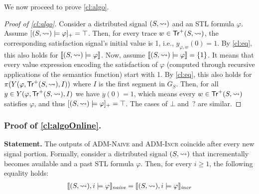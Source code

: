 We now proceed to prove \cref{cl:algo}.

\begin{proof}[\normalsize Proof of \cref{cl:algo}]
	\normalsize
	Consider a distributed signal $(S,{\rightsquigarrow})$ and an STL formula $\varphi$.
	Assume $[(S,{\rightsquigarrow}) \models \varphi]_+ = \top$.
	Then, for every trace $w \in \mathsf{Tr}^+(S,{\rightsquigarrow})$, the corresponding satisfaction signal's initial value is 1, i.e., $y_{\varphi,w}(0) = 1$.
	By \cref{cl:eq}, this also holds for $\llbracket (S, {\rightsquigarrow}) \models \varphi \rrbracket$.
	Now, assume  $\llbracket (S, {\rightsquigarrow}) \models \varphi \rrbracket = \{1\}$.
	It means that every value expression encoding the satisfaction of $\varphi$ (computed through recursive applications of the semantics function) start with 1.
	By \cref{cl:eq}, this also holds for $\pi(Y(\varphi, \mathsf{Tr}^+(S,{\rightsquigarrow}), I))$ where $I$ is the first segment in $G_S$.
	Then, for all $y \in Y(\varphi, \mathsf{Tr}^+(S,{\rightsquigarrow}), I)$ we have $y(0) = 1$, which means every $w \in \mathsf{Tr}^+(S,{\rightsquigarrow})$ satisfies $\varphi$, and thus $[(S,{\rightsquigarrow}) \models \varphi]_+ = \top$.
	The cases of $\bot$ and ${\,?}$ are similar.
\end{proof}

\bgroup \color{red}
\subsubsection*{Proof of \cref{cl:algoOnline}.}
\textbf{Statement.}
The outputs of \textsc{ADM-Naive} and \textsc{ADM-Incr} coincide after every new signal portion.
Formally, consider a distributed signal $(S,{\rightsquigarrow})$ that incrementally becomes available and a past STL formula $\varphi$.
Then, for every $i \geq 1$, the following equality holds:
\begin{align*}
	\llbracket (S, {\rightsquigarrow}), i \models \varphi \rrbracket_{\textit{naive}} = \llbracket (S, {\rightsquigarrow}), i \models \varphi \rrbracket_{\textit{incr}}
\end{align*}

